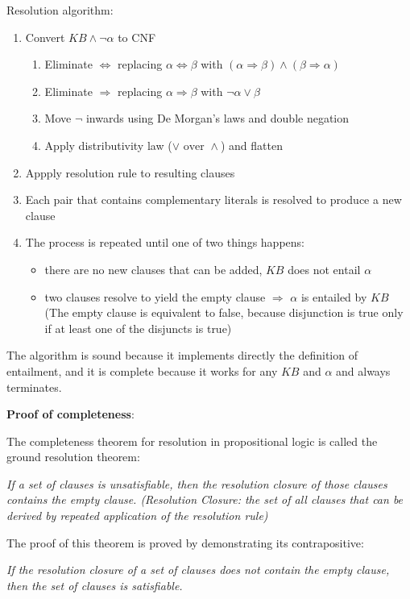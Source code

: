 \documentclass[12pt]{article}
\begin{document}
\begin{enumerate}[label=\textbf{PL.\arabic*}]
    Resolution algorithm:
    \begin{enumerate}[label=\arabic*.]
        \item Convert $KB \land \neg\alpha$ to CNF
        \begin{enumerate}
            \item Eliminate $\Leftrightarrow$ replacing $\alpha\Leftrightarrow\beta$ with $(\alpha\Rightarrow\beta)\land(\beta\Rightarrow\alpha)$
            \item Eliminate $\Rightarrow$ replacing $\alpha\Rightarrow\beta$ with $\neg\alpha\lor\beta$
            \item Move $\lnot$ inwards using De Morgan's laws and double negation
            \item Apply distributivity law ($\lor \text{ over } \land$) and flatten
        \end{enumerate}
        \item Appply resolution rule to resulting clauses
        \item Each pair that contains complementary literals is resolved to produce a new clause
        \item The process is repeated until one of two things happens:
        \begin{itemize}
            \item there are no new clauses that can be added, $KB$ does not entail $\alpha$
            \item two clauses resolve to yield the empty clause $\Rightarrow$ $\alpha$ is entailed by $KB$ (The empty clause is equivalent to false, because disjunction is true only if at least one of the disjuncts is true)
        \end{itemize}
    \end{enumerate}

    The algorithm is sound because it implements directly the definition of entailment, 
    and it is complete because it works for any $KB$ and $\alpha$ and always terminates.

    \textbf{Proof of completeness}:

    The completeness theorem for resolution in propositional logic is called the ground resolution theorem:
    \begin{center}
        \textit{
        If a set of clauses is unsatisfiable, then the resolution closure of those clauses contains the empty clause. 
        (Resolution Closure: the set of all clauses that can be derived by repeated application of the resolution rule)
        }
    \end{center}
    The proof of this theorem is proved by demonstrating its contrapositive:
    \begin{center}
        \textit{
        If the resolution closure of a set of clauses does not contain the empty clause, then the set of clauses is satisfiable.
        }
    \end{center}


\end{enumerate}
\end{document}
